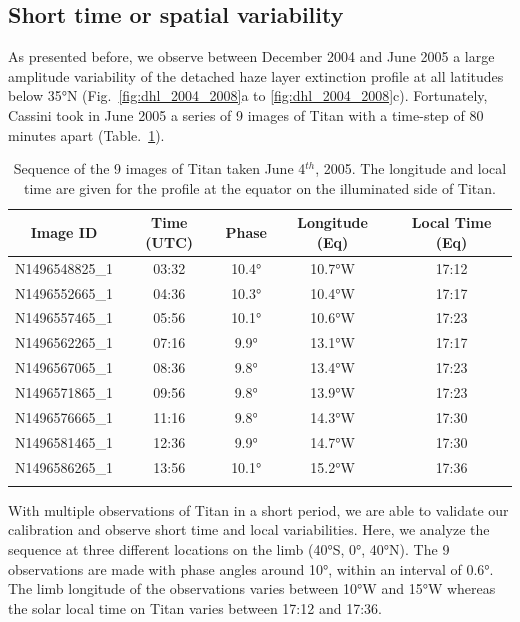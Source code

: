 \subsection{Short time or spatial  variability}

As presented before, we observe between December 2004 and June 2005 a large amplitude variability of the
detached haze layer extinction profile at all latitudes below \ang{35}N (Fig.~\ref{fig:dhl_2004_2008}a
to \ref{fig:dhl_2004_2008}c). Fortunately, Cassini took in June 2005 a series of 9 images of
Titan with a time-step of 80 minutes apart (Table.~\ref{tab:time_variability}).

\begin{table}[!ht]
    \centering
    \caption{Sequence of the 9 images of Titan taken June 4$^{th}$, 2005.
    The longitude and local time are given for the profile at the equator
    on the illuminated side of Titan.}
    \vspace{.5cm}
    \begin{tabular} {c c c c c}
        \toprule
        Image ID & Time (UTC) & Phase & Longitude (Eq) & Local Time (Eq)\\
        \midrule
        N1496548825\_1 & 03:32 & \ang{10.4} & \ang{10.7}W & 17:12 \\
        N1496552665\_1 & 04:36 & \ang{10.3} & \ang{10.4}W & 17:17 \\
        N1496557465\_1 & 05:56 & \ang{10.1} & \ang{10.6}W & 17:23 \\
        N1496562265\_1 & 07:16 &  \ang{9.9} & \ang{13.1}W & 17:17 \\
        N1496567065\_1 & 08:36 &  \ang{9.8} & \ang{13.4}W & 17:23 \\
        N1496571865\_1 & 09:56 &  \ang{9.8} & \ang{13.9}W & 17:23 \\
        N1496576665\_1 & 11:16 &  \ang{9.8} & \ang{14.3}W & 17:30 \\
        N1496581465\_1 & 12:36 &  \ang{9.9} & \ang{14.7}W & 17:30 \\
        N1496586265\_1 & 13:56 & \ang{10.1} & \ang{15.2}W & 17:36 \\
        \bottomrule
        \label{tab:time_variability}
    \end{tabular}
\end{table}

With multiple observations of Titan in a short period, we are able to validate our calibration and
observe short time and local variabilities. Here, we analyze the sequence at three different
locations on the limb (\ang{40}S, \ang{0}, \ang{40}N). The 9 observations are made with phase
angles around \ang{10}, within an interval of \ang{0.6}. The limb longitude of the observations
varies  between \ang{10}W and \ang{15}W whereas the solar local time on Titan varies between
17:12 and 17:36.

